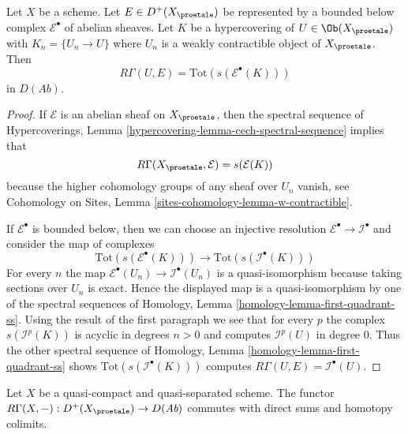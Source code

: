 \begin{lemma}
\label{lemma-compute-cohomology}
Let $X$ be a scheme. Let $E \in D^+(X_\proetale)$ be represented by
a bounded below complex $\mathcal{E}^\bullet$ of abelian sheaves.
Let $K$ be a hypercovering of $U \in \Ob(X_\proetale)$ with
$K_n = \{U_n \to U\}$ where $U_n$ is a weakly contractible object of
$X_\proetale$. Then
$$
R\Gamma(U, E) = \text{Tot}(s(\mathcal{E}^\bullet(K)))
$$
in $D(\textit{Ab})$.
\end{lemma}

\begin{proof}
If $\mathcal{E}$ is an abelian
sheaf on $X_\proetale$, then the spectral sequence of
Hypercoverings, Lemma \ref{hypercovering-lemma-cech-spectral-sequence}
implies that
$$
R\Gamma(X_\proetale, \mathcal{E}) = s(\mathcal{E}(K))
$$
because the higher cohomology groups of any sheaf over $U_n$ vanish, see
Cohomology on Sites, Lemma \ref{sites-cohomology-lemma-w-contractible}.

\medskip\noindent
If $\mathcal{E}^\bullet$ is bounded below, then we can choose an injective
resolution $\mathcal{E}^\bullet \to \mathcal{I}^\bullet$ and consider
the map of complexes
$$
\text{Tot}(s(\mathcal{E}^\bullet(K)))
\longrightarrow
\text{Tot}(s(\mathcal{I}^\bullet(K)))
$$
For every $n$ the map $\mathcal{E}^\bullet(U_n) \to \mathcal{I}^\bullet(U_n)$
is a quasi-isomorphism because taking sections over $U_n$ is exact.
Hence the displayed map is a quasi-isomorphism by one of the spectral
sequences of
Homology, Lemma \ref{homology-lemma-first-quadrant-ss}.
Using the result of the first paragraph we see that for every $p$
the complex $s(\mathcal{I}^p(K))$ is acyclic in degrees $n > 0$ and
computes $\mathcal{I}^p(U)$ in degree $0$. Thus the other spectral
sequence of
Homology, Lemma \ref{homology-lemma-first-quadrant-ss}
shows $\text{Tot}(s(\mathcal{I}^\bullet(K)))$ computes
$R\Gamma(U, E) = \mathcal{I}^\bullet(U)$.
\end{proof}

\begin{lemma}
\label{lemma-quasi-compact-quasi-separated-commutes-direct-sums}
Let $X$ be a quasi-compact and quasi-separated scheme.
The functor $R\Gamma(X, -) : D^+(X_\proetale) \to D(\textit{Ab})$
commutes with direct sums and homotopy colimits.
\end{lemma}

